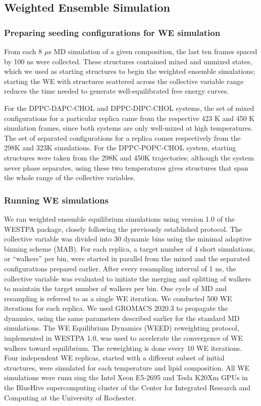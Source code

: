 \documentclass{biophys-new}
\begin{document}
\subsection*{Weighted Ensemble Simulation}

\subsubsection*{Preparing seeding configurations for WE simulation} 
From each 8 $\mu$s MD simulation of a given composition, the last ten frames spaced by 100 ns were collected.
These structures contained mixed and unmixed states, which we used as starting structures to begin the weighted ensemble simulations; starting the WE with structures scattered across the collective variable range reduces the time needed to generate well-equilibrated free energy curves.

For the DPPC-DAPC-CHOL and DPPC-DIPC-CHOL systems, the set of mixed configurations for a particular replica came from the respective 423 K and 450 K simulation frames, since both systems are only well-mixed at high temperatures.
The set of separated configurations for a replica comes respectively from the 298K and 323K simulations.
For the DPPC-POPC-CHOL system, starting structures were taken from the 298K and 450K trajectories; although the system never phase separates, using these two temperatures gives structures that span the whole range of the collective variables.

\subsubsection*{Running WE simulations} 
We ran weighted ensemble equilibrium simulations using version 1.0 of the WESTPA package\cite{Zwier2015}, closely following the previously established protocol\cite{Bogetti2019}.
The collective variable was divided into 30 dynamic bins using the minimal adaptive binning scheme (MAB)\cite{Torrillo2021}.
For each replica, a target number of 4 short simulations, or ``walkers'' per bin, were started in parallel from the mixed and the separated configurations prepared earlier.
After every resampling interval of 1 ns, the collective variable was evaluated to initiate the merging and splitting of walkers to maintain the target number of walkers per bin. One cycle of MD and resampling is referred to as a single WE iteration. 
We conducted 500 WE iterations for each replica.
We used GROMACS 2020.3 to propagate the dynamics, using the same parameters described earlier for the standard MD simulations.
The WE Equilibrium Dynamics (WEED) reweighting protocol\cite{Bhatt2010, Suarez2014}, implemented in WESTPA 1.0, was used to accelerate the convergence of WE walkers toward equilibrium.
The reweighting is done every 10 WE iterations.
Four independent WE replicas, started with a different subset of initial structures, were simulated for each temperature and lipid composition. 
All WE simulations were runu sing the Intel Xeon E5-2695 and Tesla K20Xm GPUs in the BlueHive supercomputing cluster of the Center for Integrated Research and Computing at the University of Rochester.   
\end{document}
